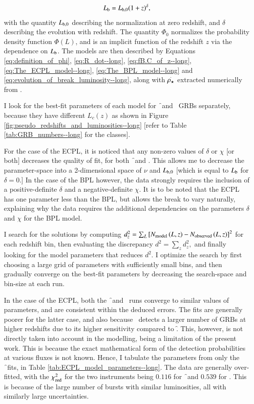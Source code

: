\begin{equation}
L_{\rm{b}} = L_{\rm{b,0}} (1+z)^{\delta},
\label{eq:evolution_of_break_luminosity--long}
\end{equation} with the quantity $L_{\rm{b,0}}$ describing the normalization at zero redshift, and $\delta$ describing the evolution with redshift. The quantity $\Phi_0$ normalizes the probability density function $\Phi(L)$, and is an implicit function of the redshift $z$ via the dependence on $L_{\rm{b}}$. The models are then described by Equations \ref{eq:definition_of_phi}, \ref{eq:R_dot--long}, \ref{eq:fB.C_of_z--long}, \ref{eq:The_ECPL_model--long}, \ref{eq:The_BPL_model--long} and \ref{eq:evolution_of_break_luminosity--long}, along with $\overset{.}{\rho_{\star}}$ extracted numerically from .

I look for the best-fit parameters of each model for \f\ and \s\ GRBs separately, because they have different $L_c (z)$ as shown in Figure \ref{fig:pseudo_redshifts_and_luminosities--long} [refer to Table \ref{tab:GRB_numbers--long} for the classes].

For the case of the ECPL, it is noticed that any non-zero values of $\delta$ or $\chi$ [or both] decreases the quality of fit, for both \f\ and \s. This allows me to decrease the parameter-space into a 2-dimensional space of $\nu$ and $L_{\rm{b,0}}$ [which is equal to $L_{\rm{b}}$ for $\delta = 0$.] In the case of the BPL however, the data strongly requires the inclusion of a positive-definite $\delta$ and a  negative-definite $\chi$. It is to be noted that the ECPL has one parameter less than the BPL, but allows the break to vary naturally, explaining why the data requires the additional dependencies on the parameters $\delta$ and $\chi$ for the BPL model.

I search for the solutions by computing $d_{z}^{2} = \sum_{L} \left[ N_{{\rm model}} \left(L, z\right) - N_{{\rm observed}} \left( L, z \right) \right]^{2}$ for each redshift bin, then evaluating the discrepancy $d^{2} = \sum_{z}d_{z}^{2},$ and finally looking for the model parameters that reduces $d^{2}.$ I optimize the search by first choosing a large grid of parameters with sufficiently small bins, and then gradually converge on the best-fit parameters by decreasing the search-space and bin-size at each run.

In the case of the ECPL, both the \f\ and \s\ runs converge to similar values of parameters, and are consistent within the deduced errors. The fits are generally poorer for the latter case, and also because \s\ detects a larger number of GRBs at higher redshifts due to its higher sensitivity compared to \f. This, however, is not directly taken into account in the modelling, being a limitation of the present work. This is because the exact mathematical form of the detection probabilities at various fluxes is not known. Hence, I tabulate the parameters from only the \f\ fits, in Table \ref{tab:ECPL_model_parameters--long}. The data are generally over-fitted, with the $\chi_{{\rm red}}^{2}$ for the two instruments being $0.116$ for \f\ and $0.539$ for \s. This is because of the large number of bursts with similar luminosities, all with similarly large uncertainties.


